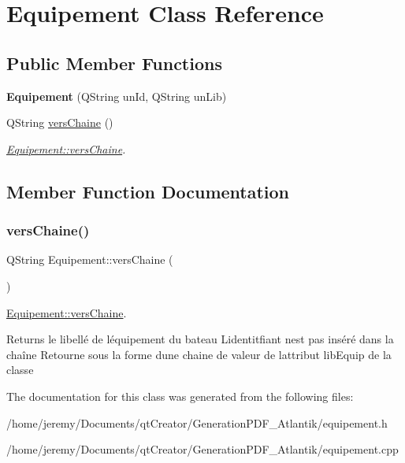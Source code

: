 \hypertarget{class_equipement}{}\section{Equipement Class Reference}
\label{class_equipement}
\subsection*{Public Member Functions}
\begin{DoxyCompactItemize}
\item 
\mbox{\label{class_equipement_a46673e4529460fe57f20c4956af5de7e}} 
{\bfseries Equipement} (Q\+String un\+Id, Q\+String un\+Lib)
\item 
Q\+String \hyperlink{class_equipement_a5e45c0b5524b353c77a23b618d73a1d0}{vers\+Chaine} ()
\begin{DoxyCompactList}\small\item\em \hyperlink{class_equipement_a5e45c0b5524b353c77a23b618d73a1d0}{Equipement\+::vers\+Chaine}. \end{DoxyCompactList}\end{DoxyCompactItemize}


\subsection{Member Function Documentation}
\mbox{\label{class_equipement_a5e45c0b5524b353c77a23b618d73a1d0}} 
\subsubsection{\texorpdfstring{vers\+Chaine()}{versChaine()}}
{\footnotesize\ttfamily Q\+String Equipement\+::vers\+Chaine (\begin{DoxyParamCaption}{ }\end{DoxyParamCaption})}



\hyperlink{class_equipement_a5e45c0b5524b353c77a23b618d73a1d0}{Equipement\+::vers\+Chaine}. 

\begin{DoxyReturn}{Returns}
le libellé de l\textquotesingle{}équipement du bateau L\textquotesingle{}identitfiant n\textquotesingle{}est pas inséré dans la chaîne Retourne sous la forme d\textquotesingle{}une chaine de valeur de l\textquotesingle{}attribut lib\+Equip de la classe 
\end{DoxyReturn}


The documentation for this class was generated from the following files\+:\begin{DoxyCompactItemize}
\item 
/home/jeremy/\+Documents/qt\+Creator/\+Generation\+P\+D\+F\+\_\+\+Atlantik/equipement.\+h\item 
/home/jeremy/\+Documents/qt\+Creator/\+Generation\+P\+D\+F\+\_\+\+Atlantik/equipement.\+cpp\end{DoxyCompactItemize}
